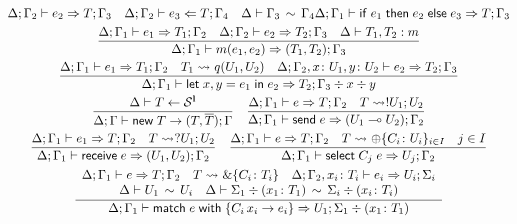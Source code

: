 \begin{figure}[t]
\begin{gather*}
{      \algtypeout[\kindEnv;\varEnv_2]{e_2}{T}{\varEnv_3}
      \quad
      \algtypein[\kindEnv;\varEnv_2]{e_3}{T}{\varEnv_4}
      \quad
      \ctxequiv{\varEnv_3}{\varEnv_4}
    }{
      \algtypeout[\kindEnv;\varEnv_1]{\conditionale{e_1}{e_2}{e_3}}{T}{\varEnv_3}
    }
    \\
    \frac{
      \algtypeout[\kindEnv ; \varEnv_1]{e_1}{T_1}{\varEnv_2}
      \quad
      \algtypeout[\kindEnv ; \varEnv_2]{e_2}{T_2}{\varEnv_3}
      \quad
      \isType{T_1,T_2}{m}
    }{
      \algtypeout[\kindEnv ; \varEnv_1]{m(e_1, e_2)}{(T_1,T_2)}{\varEnv_3}
    }
    \\
    \frac{
      \algtypeout[\kindEnv ; \varEnv_1]{e_1}{T_1}{\varEnv_2}
      \quad
      T_1 \Extract{} q(U_1, U_2)
      \quad
      \algtypeout[\kindEnv; \varEnv_2, x\colon U_1, y\colon U_2]{e_2}{T_2}{\varEnv_3}
    }{
      \algtypeout[\kindEnv;
      \varEnv_1]{\binlete{x}{y}{e_1}{e_2}}{T_2}{\varEnv_3} \div x \div y
    }
    \\
    \frac{
      \kindEnv \Alg T \leftarrow \kinds^{\Lin}
    }{
      \kindEnv;\varEnv \Alg \newe{T} \rightarrow (T, \dual{T}); \varEnv
    }
    \quad
    \frac{
      \algtypeout[\kindEnv;\varEnv_1]{e}{T}{\varEnv_2}
      \quad
      T\Extract{} !U_1;U_2
    }{
      \algtypeout[\kindEnv;\varEnv_1]{\sendce e}{(U_1\multimap U_2)}{\varEnv_2}
    }
    \\
    \frac{
      \algtypeout[\kindEnv;\varEnv_1]{e_1}{T}{\varEnv_2}
      \quad T
      \Extract{} ?U_1;U_2
    }{
      \algtypeout[\kindEnv;\varEnv_1]{\recve e}{(U_1,U_2)}{\varEnv_2}
    }
    \quad
    \frac{
      \algtypeout[\kindEnv;\varEnv_1]{e}{T}{\varEnv_2}
      \quad
      T \Extract{}\oplus\{C_i\colon U_i\}_{i\in I}
      \quad
      j \in I
    }{
      \algtypeout[\kindEnv;\varEnv_1]{\selecte{C_j}{e}}{U_j}{\varEnv_2}
    }
    \\
    \frac{
      \begin{array}{c}
      \algtypeout[\kindEnv;\varEnv_1]{e}{T}{\varEnv_2}
      \quad
      T \Extract{} \&\{C_i\colon T_i\}
    \quad
      \algtypeout[\kindEnv;\varEnv_2, x_i\colon T_i]{e_i}{U_i}{\Sigma_i}
      \\
      \typeequiv{U_1}{U_i}
      \quad
      \ctxequiv{\Sigma_1 \div (x_1\colon T_1)}{\Sigma_i \div (x_i\colon T_i)} 
      \end{array}
    }{
      \algtypeout[\kindEnv;\varEnv_1]{\matche{e}{\{C_i\,x_i
          \rightarrow e_i\}}}{U_1}{\Sigma_1 \div (x_1\colon T_1)}
}
\end{gather*}
\end{figure}
